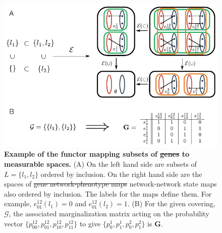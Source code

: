 \documentclass[10pt]{article}
\def\gnpm{network-network state maps} %
\providecommand{\DIFaddtex}[1]{{\protect\color{blue}\uwave{#1}}} %
\providecommand{\DIFdeltex}[1]{{\protect\color{red}\sout{#1}}}                      %
\providecommand{\DIFaddFL}[1]{\DIFadd{#1}} %
\providecommand{\DIFdelFL}[1]{\DIFdel{#1}} %
\providecommand{\DIFaddbeginFL}{} %
\providecommand{\DIFaddendFL}{} %
\providecommand{\DIFdelbeginFL}{} %
\providecommand{\DIFdelendFL}{} %
\providecommand{\DIFadd}[1]{\texorpdfstring{\DIFaddtex{#1}}{#1}} %
\providecommand{\DIFdel}[1]{\texorpdfstring{\DIFdeltex{#1}}{}} %
\begin{document}
\FloatBarrier
\pagebreak

\begin{figure}[!ht]
\centering
\noindent\includegraphics[width=0.8\columnwidth]{fig/efunctor.pdf}
\caption{{\bf Example of the functor mapping subsets of \DIFdelbeginFL \DIFdelFL{genes }\DIFdelendFL \DIFaddbeginFL \DIFaddFL{variables }\DIFaddendFL to measurable spaces.} (A) On the left hand side are subsets of $L=\{l_1,l_2\}$ ordered by inclusion. On the right hand side are the spaces of \DIFdelbeginFL \DIFdelFL{gene network-phenotype maps }\DIFdelendFL \DIFaddbeginFL \gnpm{} \DIFaddendFL also ordered by inclusion. The labels for the maps define them. For example, $e^{12}_{01}(l_1) = 0$ and $e^{12}_{01}(l_2) = 1$. (B) For the given covering, $\mathcal{G}$, the associated marginalization matrix acting on the probability vector $\{ p^{12}_{00},p^{12}_{01},p^{12}_{10},p^{12}_{11} \}$ to give $\{ p^{1}_{0},p^{1}_{1},p^{2}_{0},p^{2}_{1} \}$ is $\mathbf{G}$.}
\label{fig:efunctor}
\end{figure}

\pagebreak
\end{document}

